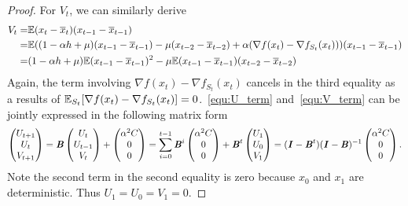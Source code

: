 \begin{lemma}
\begin{proof}
		For $V_t$, we can similarly derive
		\begin{equation}
		\begin{aligned}			
			V_t = & \mathbb{E} (x_t - \overline{x}_t) (x_{t-1} - \overline{x}_{t-1} ) \\
			= & \mathbb{E} ( (1 - \alpha h + \mu) (x_{t-1} - \overline{x}_{t-1} ) - \mu (x_{t-2} - \overline{x}_{t-2}) + \alpha (\nabla f(x_t) - \nabla f_{S_t}(x_t) ) ) (x_{t-1} - \overline{x}_{t-1} ) \\
			= & (1 - \alpha h + \mu)\mathbb{E} ( x_{t-1} - \overline{x}_{t-1} )^2 - \mu \mathbb{E} (x_{t-1} - \overline{x}_{t-1})(x_{t-2} - \overline{x}_{t-2})
		\end{aligned}
		\label{equ:V_term}
		\end{equation}
		Again, the term involving $\nabla f(x_t) - \nabla f_{S_t}(x_t)$ cancels in the third equality as a results of $\mathbb{E}_{S_t} [\nabla f(x_t) - \nabla f_{S_t}(x_t)]=0$.~\eqref{equ:U_term} and~\eqref{equ:V_term} can be jointly expressed in the following matrix form
		\begin{equation}
		\begin{aligned}
			\begin{pmatrix}
			U_{t+1} \\
			U_t \\
			V_{t + 1}
		\end{pmatrix}= \bm{\mathit{B}} 
		\begin{pmatrix}
			U_t \\
			U_{t-1} \\
			V_t
		\end{pmatrix} + 
		\begin{pmatrix}
			\alpha^2 C \\
			0 \\
			0
		\end{pmatrix}
		=\sum\limits_{i = 0}^{t-1} \bm{\mathit{B}}^{i} \begin{pmatrix}
			\alpha^2 C \\
			0 \\
			0
		\end{pmatrix} + \bm{\mathit{B}}^t \begin{pmatrix}
			U_1 \\
			U_0 \\
			V_1
		\end{pmatrix}
		= (\bm{\mathit{I}} - \bm{\mathit{B}}^t)(\bm{\mathit{I}} - \bm{\mathit{B}})^{-1}
		\begin{pmatrix}
			\alpha^2 C \\
			0 \\
			0
		\end{pmatrix}.
		\end{aligned}
		\end{equation}
		Note the second term in the second equality is zero because $x_0$ and $x_1$ are deterministic. Thus $U_1\!=\!U_0\!=\!V_1\!=\!0$.
	\end{proof}
\end{lemma}

